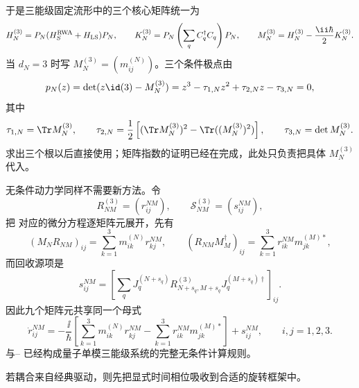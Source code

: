 于是三能级固定流形中的三个核心矩阵统一为
\begin{equation}
H_N^{(3)}=P_N(H_S^{\rm RWA}+H_{\rm LS})P_N,
\qquad
K_N^{(3)}=P_N\left(\sum_qC_q^\dagger C_q\right)P_N,
\qquad
M_N^{(3)}=H_N^{(3)}-\frac{\ii\hbar}{2}K_N^{(3)}.
\label{eq:phys-oqs-three-m}
\end{equation}
当 $d_N=3$ 时写 $M_N^{(3)}=(m_{ij}^{(N)})$。三个条件极点由
\begin{equation}
p_N(z)=\det(z\id(3)-M_N^{(3)})
=z^3-\tau_{1,N}z^2+\tau_{2,N}z-\tau_{3,N}=0,
\label{eq:phys-oqs-three-cubic}
\end{equation}
其中
\[
\tau_{1,N}=\Tr M_N^{(3)},\qquad
\tau_{2,N}=\frac12\left[(\Tr M_N^{(3)})^2-\Tr((M_N^{(3)})^2)\right],\qquad
\tau_{3,N}=\det M_N^{(3)}.
\]
求出三个根以后直接使用；矩阵指数的证明已经在完成，此处只负责把具体 $M_N^{(3)}$ 代入。

无条件动力学同样不需要新方法。令
\[
R_{NM}^{(3)}=(r_{ij}^{NM}),
\qquad
\mathcal S_{NM}^{(3)}=(s_{ij}^{NM}),
\]
把 对应的微分方程逐矩阵元展开，先有
\[
(M_NR_{NM})_{ij}=\sum_{k=1}^{3}m_{ik}^{(N)}r_{kj}^{NM},
\qquad
(R_{NM}M_M^\dagger)_{ij}
=\sum_{k=1}^{3}r_{ik}^{NM}m_{jk}^{(M)*},
\]
而回收源项是
\[
s_{ij}^{NM}
=\left[
\sum_qJ_q^{(N+s_q)}R_{N+s_q,M+s_q}^{(3)}J_q^{(M+s_q)\dagger}
\right]_{ij}.
\]
因此九个矩阵元共享同一个母式
\begin{equation}
\dot r_{ij}^{NM}
=-\frac{\ii}{\hbar}
\left[
\sum_{k=1}^3m_{ik}^{(N)}r_{kj}^{NM}
-\sum_{k=1}^3r_{ik}^{NM}m_{jk}^{(M)*}
\right]
+s_{ij}^{NM},
\qquad i,j=1,2,3.
\label{eq:phys-oqs-three-block-elements}
\end{equation}
 与-- 已经构成量子单模三能级系统的完整无条件计算规则。

若耦合来自经典驱动，则先把显式时间相位吸收到合适的旋转框架中。

